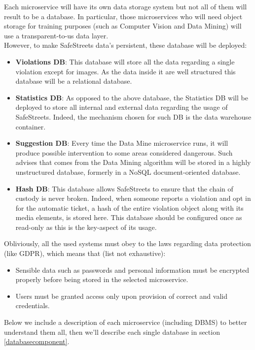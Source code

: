 Each microservice will have its own data storage system but not all of them will result to be a database. In particular, those microservices who will need object storage for training purposes (such as Computer Vision and Data Mining) will use a transparent-to-us data layer.\\
However, to make SafeStreets data's persistent, these database will be deployed:
\begin{itemize}
	\item \textbf{Violations DB}: This database will store all the data regarding a single violation except for images. As the data inside it are well structured this database will be a relational database.
	\item \textbf{Statistics DB}: As opposed to the above database, the Statistics DB will be deployed to store all internal and external data regarding the usage of SafeStreets. Indeed, the mechanism chosen for such DB is the data warehouse container.
	\item \textbf{Suggestion DB}: Every time the Data Mine microservice runs, it will produce possible intervention to some areas considered dangerous. Such advises that comes from the Data Mining algorithm will be stored in a highly unstructured database, formerly in a NoSQL document-oriented database.
	\item \textbf{Hash DB}: This database allows SafeStreets to ensure that the chain of custody is never broken. Indeed, when someone reports a violation and opt in for the automatic ticket, a hash of the entire violation object along with its media elements, is stored here. This database should be configured once as read-only as this is the key-aspect of its usage.
\end{itemize}
Obliviously, all the used systems must obey to the laws regarding data protection (like GDPR), which means that (list not exhaustive):
\begin{itemize}
\item Sensible data such as passwords and personal information must be encrypted properly before being stored in the selected microservice.
\item Users must be granted access only upon provision of correct and valid credentials.
\end{itemize}

Below we include a description of each microservice (including DBMS) to better understand them all, then we'll describe each single database in section \ref{databasecomponent}.